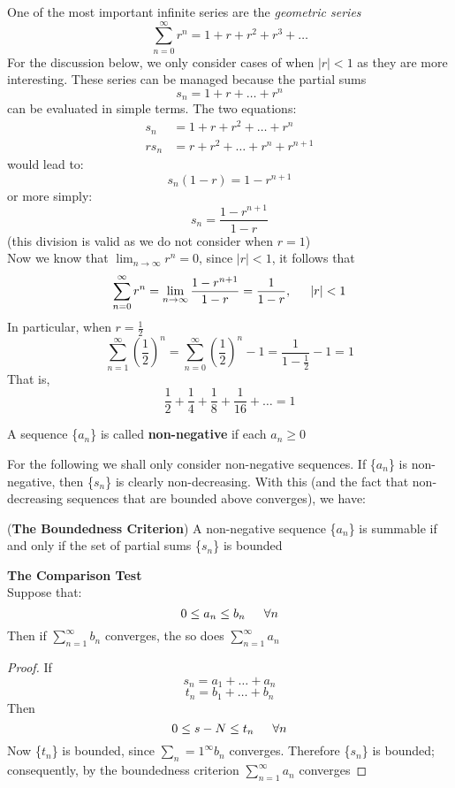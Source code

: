One of the most important infinite series are the \textit{geometric series} 
$$\sum_{n=0}^\infty r^n = 1 + r + r^2 + r^3 + \dots$$
For the discussion below, we only consider cases of when  $|r| < 1$ as they are more interesting. These series can be managed because the partial sums 
$$s_n = 1 + r + \dots + r^n$$
can be evaluated in simple terms. The two equations:
\begin{align*}
    s_n &= 1 + r + r^2 + \dots + r^n \\
    rs_n &= r + r^2 + \dots + r^n + r^{n+1}
\end{align*}
would lead to:
$$ s_n(1-r)=1-r^{n+1}$$
or more simply:
$$s_n = \frac{1-r^{n+1}}{1-r}$$
(this division is valid as we do not consider when $r=1$)\\
Now we know that $\lim _{n \to \infty}r^n = 0$, since $|r|<1$, it follows that 
$$\sum_{n=0}^\infty r^n = \lim_{n \to \infty} \frac{1-r^{n+1}}{1-r} = \frac{1}{1-r}, \indent |r| < 1$$
In particular, when $r = \frac{1}{2}$
$$\sum_{n=1}^\infty \left(\frac{1}{2} \right)^n = \sum_{n=0}^\infty \left(\frac{1}{2} \right)^n - 1 = \frac{1}{1-\frac{1}{2}} - 1 =1$$
That is,
$$\frac{1}{2} + \frac{1}{4} + \frac{1}{8} + \frac{1}{16} + \dots = 1$$
\begin{definition}
    A sequence \{$a_n$\} is called \textbf{non-negative} if each $a_n \geq 0$
\end{definition}
For the following we shall only consider non-negative sequences. If \{$a_n$\} is non-negative, then \{$s_n$\} is clearly non-decreasing. With this (and the fact that non-decreasing sequences that are bounded above converges), we  have:
\begin{lemma}
    (\textbf{The Boundedness Criterion}) A non-negative sequence \{$a_n$\} is summable if and only if the set of partial sums \{$s_n$\} is bounded
\end{lemma}

\begin{theorem}
    \textbf{The Comparison Test} \\
    Suppose that:
    $$0 \leq a_n \leq b_n \indent \forall n$$
    Then if $\sum _{n=1}^ \infty b_n$ converges, the so does $\sum_{n = 1}^ \infty a_n$
\end{theorem}
\begin{proof}
    If 
    $$s_n = a_1 + \dots + a_n$$
    $$t_n = b_1 + \dots + b_n$$
    Then 
    $$0 \leq s-N \leq t_n \indent \forall n$$
    Now \{$t_n$\} is bounded, since $\sum_n=1 ^\infty b_n$ converges. Therefore \{$s_n$\} is bounded; consequently, by the boundedness criterion $\sum_{n=1}^ \infty a_n$ converges
\end{proof} \bigskip

